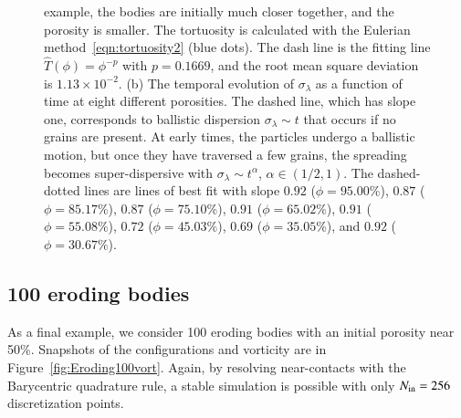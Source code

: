 \documentclass[preprint,10pt]{elsarticle}
\begin{document}
\begin{figure}[H]
{example, the bodies are initially much closer together, and the porosity
is smaller.  The tortuosity is calculated with the Eulerian
method~\eqref{eqn:tortuosity2} (blue dots).  The dash line is the
fitting line $\widehat{T}(\phi)=\phi^{-p}$ with $p=0.1669$, and the root
mean square deviation is $1.13 \times 10^{-2}$.  (b) The temporal
evolution of $\sigma_\lambda$ as a function of time at eight different
porosities.  The dashed line, which has slope one, corresponds to
ballistic dispersion $\sigma_\lambda \sim t$ that occurs if no grains
are present.  At early times, the particles undergo a ballistic motion,
but once they have traversed a few grains, the spreading becomes
super-dispersive with $\sigma_\lambda \sim t^{\alpha}$, $\alpha \in
(1/2,1)$.  The dashed-dotted lines are lines of best fit with slope
$0.92$ ($\phi=95.00\%$), $0.87$ ($\phi=85.17\%$), $0.87$
($\phi=75.10\%$), $0.91$ ($\phi=65.02\%$), $0.91$ ($\phi=55.08\%$),
$0.72$ ($\phi=45.03\%$), $0.69$ ($\phi=35.05\%$), and $0.92$
($\phi=30.67\%$).}
\end{figure}



\subsection{100 eroding bodies}
\label{sec:Eroding100}
As a final example, we consider 100 eroding bodies with an initial
porosity near 50\%.  Snapshots of the configurations and vorticity are
in Figure~\ref{fig:Eroding100vort}.  Again, by resolving near-contacts
with the Barycentric quadrature rule, a stable simulation is possible
with only $N_{\mathrm{in}} = 256$ discretization points.
\end{document}
